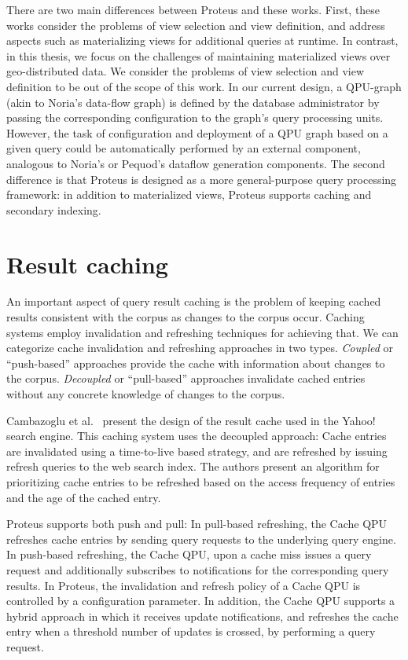 There are two main differences between Proteus and these works.
First, these works consider the problems of view selection and view definition,
and address aspects such as materializing views for additional queries at runtime.
In contrast, in this thesis, we focus on the challenges of maintaining materialized views over geo-distributed data.
We consider the problems of view selection and view definition to be out of the scope of this work.
In our current design, a QPU-graph (akin to Noria's data-flow graph) is defined by the database administrator by passing
the corresponding configuration to the graph's query processing units.
However, the task of configuration and deployment of a QPU graph based on a given query could be automatically performed
by an external component, analogous to Noria's or Pequod's dataflow generation components.
The second difference is that Proteus is designed as a more general-purpose query processing framework:
in addition to materialized views, Proteus supports caching and secondary indexing.

\section{Result caching}
\label{sec:related_caching}
An important aspect of query result caching is the problem of keeping cached results consistent with the corpus
as changes to the corpus occur.
Caching systems employ invalidation and refreshing techniques for achieving that.
We can categorize cache invalidation and refreshing approaches in two types.
\textit{Coupled} or ``push-based'' approaches provide the cache with information about changes to the corpus.
\textit{Decoupled} or ``pull-based'' approaches invalidate cached entries without any concrete knowledge of changes to the corpus.

Cambazoglu et al.\ \cite{cambazoglu:yahoorefreshing} present the design of the result cache used
in the Yahoo! search engine.
This caching system uses the decoupled approach:
Cache entries are invalidated using a time-to-live based strategy,
and are refreshed by issuing refresh queries to the web search index.
The authors present an algorithm for prioritizing cache entries to be refreshed based on the access frequency of entries and
the age of the cached entry.

Proteus supports both push and pull:
In pull-based refreshing, the Cache QPU refreshes cache entries by sending query requests to the underlying query engine.
In push-based refreshing, the Cache QPU, upon a cache miss issues a query request and additionally subscribes to
notifications for the corresponding query results.
In Proteus, the invalidation and refresh policy of a Cache QPU is controlled by a configuration parameter.
In addition, the Cache QPU supports a hybrid approach in which it receives update notifications,
and refreshes the cache entry when a threshold number of updates is crossed,
by performing a query request.


